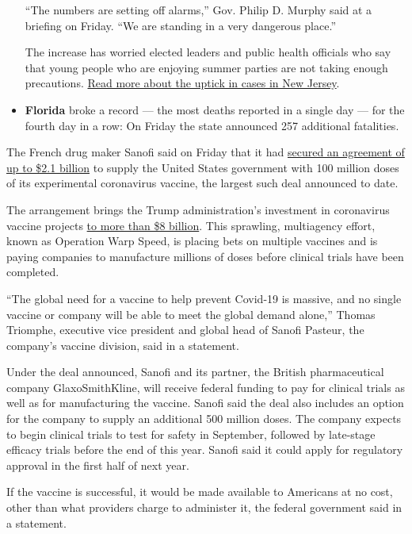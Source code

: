 \begin{itemize}
  ``The numbers are setting off alarms,'' Gov. Philip D. Murphy said at
  a briefing on Friday. ``We are standing in a very dangerous place.''

  The increase has worried elected leaders and public health officials
  who say that young people who are enjoying summer parties are not
  taking enough precautions.
  \href{https://www.nytimes3xbfgragh.onion/2020/07/30/nyregion/coronavirus-cases-nj.html}{Read
  more about the uptick in cases in New Jersey}.
\item
  \textbf{Florida} broke a record --- the most deaths reported in a
  single day --- for the fourth day in a row: On Friday the state
  announced 257 additional fatalities.
\end{itemize}

The French drug maker Sanofi said on Friday that it had
\href{https://www.nytimes3xbfgragh.onion/2020/07/31/health/covid-19-vaccine-sanofi-gsk.html}{secured
an agreement of up to \$2.1 billion} to supply the United States
government with 100 million doses of its experimental coronavirus
vaccine, the largest such deal announced to date.

The arrangement brings the Trump administration's investment in
coronavirus vaccine projects
\href{https://medicalcountermeasures.gov/app/barda/coronavirus/COVID19.aspx?filter=vaccine}{to
more than \$8 billion}. This sprawling, multiagency effort, known as
Operation Warp Speed, is placing bets on multiple vaccines and is paying
companies to manufacture millions of doses before clinical trials have
been completed.

``The global need for a vaccine to help prevent Covid-19 is massive, and
no single vaccine or company will be able to meet the global demand
alone,'' Thomas Triomphe, executive vice president and global head of
Sanofi Pasteur, the company's vaccine division, said in a statement.

Under the deal announced, Sanofi and its partner, the British
pharmaceutical company GlaxoSmithKline, will receive federal funding to
pay for clinical trials as well as for manufacturing the vaccine. Sanofi
said the deal also includes an option for the company to supply an
additional 500 million doses. The company expects to begin clinical
trials to test for safety in September, followed by late-stage efficacy
trials before the end of this year. Sanofi said it could apply for
regulatory approval in the first half of next year.

If the vaccine is successful, it would be made available to Americans at
no cost, other than what providers charge to administer it, the federal
government said in a statement.

